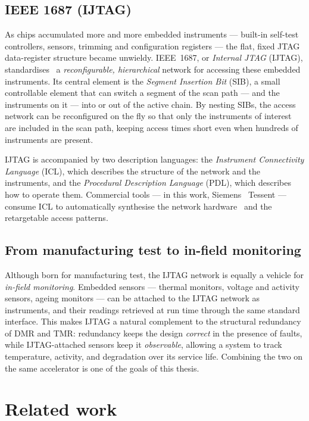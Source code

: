 \subsection{IEEE 1687 (IJTAG)}

As chips accumulated more and more embedded instruments --- built-in self-test
controllers, sensors, trimming and configuration registers --- the flat,
fixed JTAG data-register structure became unwieldy. IEEE~1687, or
\emph{Internal JTAG} (IJTAG), standardises~\cite{ijtag} a \emph{reconfigurable, hierarchical}
network for accessing these embedded instruments. Its central element is the
\emph{Segment Insertion Bit} (SIB), a small controllable element that can switch
a segment of the scan path --- and the instruments on it --- into or out of the
active chain. By nesting SIBs, the access network can be reconfigured on the fly
so that only the instruments of interest are included in the scan path, keeping
access times short even when hundreds of instruments are present.

IJTAG is accompanied by two description languages: the \emph{Instrument
Connectivity Language} (ICL), which describes the structure of the network and
the instruments, and the \emph{Procedural Description Language} (PDL), which
describes how to operate them. Commercial tools --- in this work, Siemens~\cite{tessent}
Tessent --- consume ICL to automatically synthesise the network hardware~\cite{ijtag-network} and the
retargetable access patterns.

\subsection{From manufacturing test to in-field monitoring}

Although born for manufacturing test, the IJTAG network is equally a vehicle for
\emph{in-field monitoring}. Embedded sensors --- thermal monitors, voltage and
activity sensors, ageing monitors --- can be attached to the IJTAG network as
instruments, and their readings retrieved at run time through the same standard
interface. This makes IJTAG a natural complement to the structural redundancy of
DMR and TMR: redundancy keeps the design \emph{correct} in the presence of
faults, while IJTAG-attached sensors keep it \emph{observable}, allowing a system
to track temperature, activity, and degradation over its service life. Combining
the two on the same accelerator is one of the goals of this thesis.

\section{Related work}
\label{sec:related}

